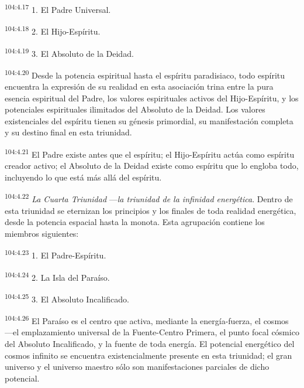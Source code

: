 \documentclass[twoside, 11pt]{book}
\begin{document}
\par
\textsuperscript{104:4.17} 1. El Padre Universal.

\par
\textsuperscript{104:4.18} 2. El Hijo-Espíritu.

\par
\textsuperscript{104:4.19} 3. El Absoluto de la Deidad.

\par
\textsuperscript{104:4.20} Desde la potencia espiritual hasta el espíritu paradisiaco, todo espíritu encuentra la expresión de su realidad en esta asociación trina entre la pura esencia espiritual del Padre, los valores espirituales activos del Hijo-Espíritu, y los potenciales espirituales ilimitados del Absoluto de la Deidad. Los valores existenciales del espíritu tienen su génesis primordial, su manifestación completa y su destino final en esta triunidad.

\par
\textsuperscript{104:4.21} El Padre existe antes que el espíritu; el Hijo-Espíritu actúa como espíritu creador activo; el Absoluto de la Deidad existe como espíritu que lo engloba todo, incluyendo lo que está más allá del espíritu.

\par
\textsuperscript{104:4.22} \textit{La Cuarta Triunidad} ---\textit{la triunidad de la infinidad energética}. Dentro de esta triunidad se eternizan los principios y los finales de toda realidad energética, desde la potencia espacial hasta la monota. Esta agrupación contiene los miembros siguientes:

\par
\textsuperscript{104:4.23} 1. El Padre-Espíritu.

\par
\textsuperscript{104:4.24} 2. La Isla del Paraíso.

\par
\textsuperscript{104:4.25} 3. El Absoluto Incalificado.

\par
\textsuperscript{104:4.26} El Paraíso es el centro que activa, mediante la energía-fuerza, el cosmos ---el emplazamiento universal de la Fuente-Centro Primera, el punto focal cósmico del Absoluto Incalificado, y la fuente de toda energía. El potencial energético del cosmos infinito se encuentra existencialmente presente en esta triunidad; el gran universo y el universo maestro sólo son manifestaciones parciales de dicho potencial.
\end{document}
